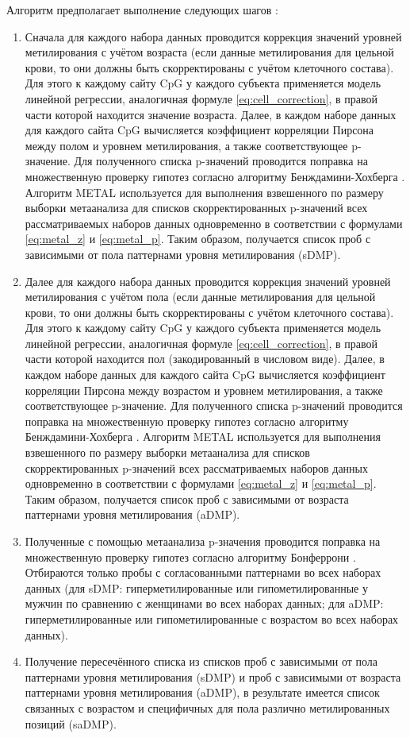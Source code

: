 Алгоритм предполагает выполнение следующих шагов \autocite{Yusipov2020}:
\begin{enumerate}
	\item Сначала для каждого набора данных проводится коррекция значений уровней метилирования с учётом возраста (если данные метилирования для цельной крови, то они должны быть скорректированы с учётом клеточного состава). Для этого к каждому сайту CpG у каждого субъекта применяется модель линейной регрессии, аналогичная формуле \ref{eq:cell_correction}, в правой части которой находится значение возраста. Далее, в каждом наборе данных для каждого сайта CpG вычисляется коэффициент корреляции Пирсона \autocite{royal1895proceedings} между полом и уровнем метилирования, а также соответствующее p-значение. Для полученного списка p-значений проводится поправка на множественную проверку гипотез согласно алгоритму Бенждамини-Хохберга \autocite{Benjamini1995}. Алгоритм METAL \autocite{Willer2010} используется для выполнения взвешенного по размеру выборки метаанализа для списков скорректированных p-значений всех рассматриваемых наборов данных одновременно в соответствии с формулами \ref{eq:metal_z} и \ref{eq:metal_p}. Таким образом, получается список проб с зависимыми от пола паттернами уровня метилирования (sDMP).
	\item Далее для каждого набора данных проводится коррекция значений уровней метилирования с учётом пола (если данные метилирования для цельной крови, то они должны быть скорректированы с учётом клеточного состава). Для этого к каждому сайту CpG у каждого субъекта применяется модель линейной регрессии, аналогичная формуле \ref{eq:cell_correction}, в правой части которой находится пол (закодированный в числовом виде). Далее, в каждом наборе данных для каждого сайта CpG вычисляется коэффициент корреляции Пирсона \autocite{royal1895proceedings} между возрастом и уровнем метилирования, а также соответствующее p-значение. Для полученного списка p-значений проводится поправка на множественную проверку гипотез согласно алгоритму Бенждамини-Хохберга \autocite{Benjamini1995}. Алгоритм METAL \autocite{Willer2010} используется для выполнения взвешенного по размеру выборки метаанализа для списков скорректированных p-значений всех рассматриваемых наборов данных одновременно в соответствии с формулами \ref{eq:metal_z} и \ref{eq:metal_p}. Таким образом, получается список проб с зависимыми от возраста паттернами уровня метилирования (aDMP).
	\item Полученные с помощью метаанализа p-значения проводится поправка на множественную проверку гипотез согласно алгоритму Бонферрони \autocite{bonferroni1936teoria}. Отбираются только пробы с согласованными паттернами во всех наборах данных (для sDMP: гиперметилированные или гипометилированные у мужчин по сравнению с женщинами во всех наборах данных; для aDMP: гиперметилированные или гипометилированные с возрастом во всех наборах данных).
	\item Получение пересечённого списка из списков проб с зависимыми от пола паттернами уровня метилирования (sDMP) и проб с зависимыми от возраста паттернами уровня метилирования (aDMP), в результате имеется список связанных с возрастом и специфичных для пола различно метилированных позиций (saDMP).
\end{enumerate}

